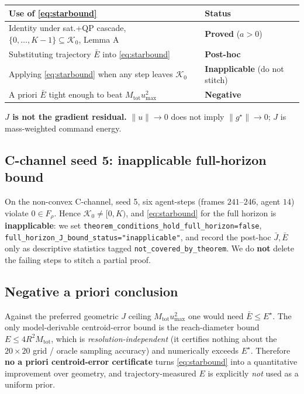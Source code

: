 \begin{center}
\begin{tabular}{ll}
\toprule
Use of \eqref{eq:starbound} & Status \\
\midrule
Identity under sat.+QP cascade, $\{0,\dots,K-1\}\subseteq\mathcal{K}_0$, Lemma A & \textbf{Proved} ($a>0$) \\
Substituting trajectory $\bar E$ into \eqref{eq:starbound} & \textbf{Post-hoc} \\
Applying \eqref{eq:starbound} when any step leaves $\mathcal{K}_0$ & \textbf{Inapplicable} (do not stitch) \\
A priori $\bar E$ tight enough to beat $M_{\mathrm{tot}}u_{\max}^2$ & \textbf{Negative} \\
\bottomrule
\end{tabular}
\end{center}

\noindent\textbf{$J$ is not the gradient residual.} $\|u\|\to0$ does not imply
$\|g^\star\|\to0$; $J$ is mass-weighted command energy.

\subsection{C-channel seed 5: inapplicable full-horizon bound}
On the non-convex C-channel, seed 5, six agent-steps (frames $241$--$246$,
agent $14$) violate $0\in F_\rho$. Hence
$\mathcal{K}_0\neq[0,K)$, and \eqref{eq:starbound} for the full horizon is
\textbf{inapplicable}: we set
\texttt{theorem\_conditions\_hold\_full\_horizon=false},
\texttt{full\_horizon\_J\_bound\_status="inapplicable"}, and record the post-hoc
$\bar J,\bar E$ only as descriptive statistics tagged
\texttt{not\_covered\_by\_theorem}. We do \textbf{not} delete the failing steps
to stitch a partial proof.

\subsection{Negative a priori conclusion}
Against the preferred geometric $J$ ceiling $M_{\mathrm{tot}}u_{\max}^2$ one would
need $\bar E\le E^\star$. The only model-derivable centroid-error bound is the
reach-diameter bound $E\le 4R^2 M_{\mathrm{tot}}$, which is
\emph{resolution-independent} (it certifies nothing about the $20\times20$
grid / oracle sampling accuracy) and numerically exceeds $E^\star$. Therefore
\textbf{no a priori centroid-error certificate} turns \eqref{eq:starbound} into a
quantitative improvement over geometry, and trajectory-measured $E$ is
explicitly \emph{not} used as a uniform prior.

